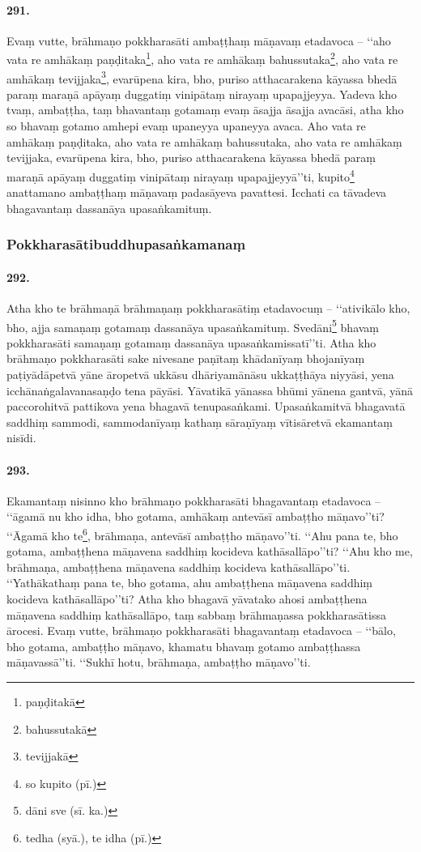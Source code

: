 \paragraph{291.} Evaṃ vutte, brāhmaṇo pokkharasāti ambaṭṭhaṃ māṇavaṃ etadavoca – ‘‘aho vata re amhākaṃ paṇḍitaka\footnote{paṇḍitakā}, aho vata re amhākaṃ bahussutaka\footnote{bahussutakā}, aho vata re amhākaṃ tevijjaka\footnote{tevijjakā}, evarūpena kira, bho, puriso atthacarakena kāyassa bhedā paraṃ maraṇā apāyaṃ duggatiṃ vinipātaṃ nirayaṃ upapajjeyya. Yadeva kho tvaṃ, ambaṭṭha, taṃ bhavantaṃ gotamaṃ evaṃ āsajja āsajja avacāsi, atha kho so bhavaṃ gotamo amhepi evaṃ upaneyya upaneyya avaca. Aho vata re amhākaṃ paṇḍitaka, aho vata re amhākaṃ bahussutaka, aho vata re amhākaṃ tevijjaka, evarūpena kira, bho, puriso atthacarakena kāyassa bhedā paraṃ maraṇā apāyaṃ duggatiṃ vinipātaṃ nirayaṃ upapajjeyyā’’ti, kupito\footnote{so kupito (pī.)} anattamano ambaṭṭhaṃ māṇavaṃ padasāyeva pavattesi. Icchati ca tāvadeva bhagavantaṃ dassanāya upasaṅkamituṃ.

\subsubsection{Pokkharasātibuddhupasaṅkamanaṃ}

\paragraph{292.} Atha kho te brāhmaṇā brāhmaṇaṃ pokkharasātiṃ etadavocuṃ – ‘‘ativikālo kho, bho, ajja samaṇaṃ gotamaṃ dassanāya upasaṅkamituṃ. Svedāni\footnote{dāni sve (sī. ka.)} bhavaṃ pokkharasāti samaṇaṃ gotamaṃ dassanāya upasaṅkamissatī’’ti. Atha kho brāhmaṇo pokkharasāti sake nivesane paṇītaṃ khādanīyaṃ bhojanīyaṃ paṭiyādāpetvā yāne āropetvā ukkāsu dhāriyamānāsu ukkaṭṭhāya niyyāsi, yena icchānaṅgalavanasaṇḍo tena pāyāsi. Yāvatikā yānassa bhūmi yānena gantvā, yānā paccorohitvā pattikova yena bhagavā tenupasaṅkami. Upasaṅkamitvā bhagavatā saddhiṃ sammodi, sammodanīyaṃ kathaṃ sāraṇīyaṃ vītisāretvā ekamantaṃ nisīdi.

\paragraph{293.} Ekamantaṃ nisinno kho brāhmaṇo pokkharasāti bhagavantaṃ etadavoca – ‘‘āgamā nu kho idha, bho gotama, amhākaṃ antevāsī ambaṭṭho māṇavo’’ti? ‘‘Āgamā kho te\footnote{tedha (syā.), te idha (pī.)}, brāhmaṇa, antevāsī ambaṭṭho māṇavo’’ti. ‘‘Ahu pana te, bho gotama, ambaṭṭhena māṇavena saddhiṃ kocideva kathāsallāpo’’ti? ‘‘Ahu kho me, brāhmaṇa, ambaṭṭhena māṇavena saddhiṃ kocideva kathāsallāpo’’ti. ‘‘Yathākathaṃ pana te, bho gotama, ahu ambaṭṭhena māṇavena saddhiṃ kocideva kathāsallāpo’’ti? Atha kho bhagavā yāvatako ahosi ambaṭṭhena māṇavena saddhiṃ kathāsallāpo, taṃ sabbaṃ brāhmaṇassa pokkharasātissa ārocesi. Evaṃ vutte, brāhmaṇo pokkharasāti bhagavantaṃ etadavoca – ‘‘bālo, bho gotama, ambaṭṭho māṇavo, khamatu bhavaṃ gotamo ambaṭṭhassa māṇavassā’’ti. ‘‘Sukhī hotu, brāhmaṇa, ambaṭṭho māṇavo’’ti.

